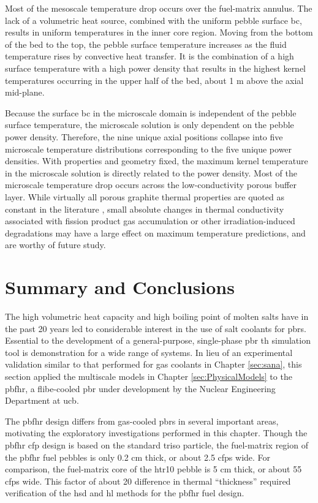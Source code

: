 Most of the mesoscale temperature drop occurs over the fuel-matrix annulus. The lack of a volumetric heat source, combined with the uniform pebble surface \gls{bc}, results in uniform temperatures in the inner core region. Moving from the bottom of the bed to the top, the pebble surface temperature increases as the fluid temperature rises by convective heat transfer. It is the combination of a high surface temperature with a high power density that results in the highest kernel temperatures occurring in the upper half of the bed, about 1 \si{\meter} above the axial mid-plane.

Because the surface \gls{bc} in the microscale domain is independent of the pebble surface temperature, the microscale solution is only dependent on the pebble power density. Therefore, the nine unique axial positions collapse into five microscale temperature distributions corresponding to the five unique power densities. With properties and geometry fixed, the maximum kernel temperature in the microscale solution is directly related to the power density. Most of the microscale temperature drop occurs across the low-conductivity porous buffer layer. While virtually all porous graphite thermal properties are quoted as constant in the literature \cite{sun,tecdoc1694,xin_wang_thesis,stainsby,parfume,hales,rochais,lopez_honorato}, small absolute changes in thermal conductivity associated with fission product gas accumulation or other irradiation-induced degradations may have a large effect on maximum temperature predictions, and are worthy of future study.

\section{Summary and Conclusions}
\label{sec:conclusions_fhr}

The high volumetric heat capacity and high boiling point of molten salts have in the past 20 years led to considerable interest in the use of salt coolants for \glspl{pbr}. Essential to the development of a general-purpose, single-phase \gls{pbr} \gls{th} simulation tool is demonstration for a wide range of systems. In lieu of an experimental validation similar to that performed for gas coolants in Chapter \ref{sec:sana}, this section applied the multiscale models in Chapter \ref{sec:PhysicalModels} to the \gls{pbfhr}, a \gls{flibe}-cooled \gls{pbr} under development by the Nuclear Engineering Department at \gls{ucb}.

The \gls{pbfhr} design differs from gas-cooled \glspl{pbr} in several important areas, motivating the exploratory investigations performed in this chapter. Though the \gls{pbfhr} \gls{cfp} design is based on the standard \gls{triso} particle, the fuel-matrix region of the \gls{pbfhr} fuel pebbles is only 0.2 \si{\centi\meter} thick, or about 2.5 \glspl{cfp} wide. For comparison, the fuel-matrix core of the \gls{htr10} pebble is 5 \si{\centi\meter} thick, or about 55 \glspl{cfp} wide. This factor of about 20 difference in thermal ``thickness'' required verification of the \gls{hsd} and \gls{hl} methods for the \gls{pbfhr} fuel design.

